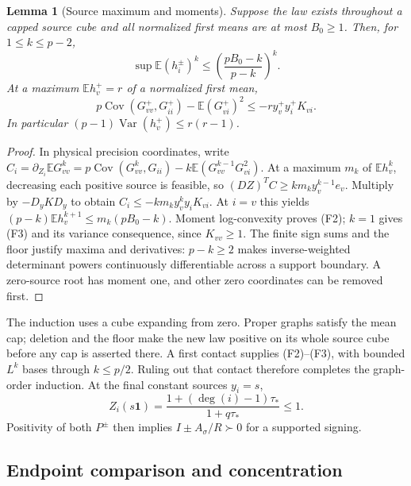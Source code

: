 \documentclass[10pt]{article}
\numberwithin{equation}{section}
\newtheorem{lemma}{Lemma}[section]
\newcommand{\1}{\mathbf1}
\begin{document}
\begin{lemma}[Source maximum and moments]\label{lem:fw-maximum}
Suppose the law exists throughout a capped source cube and all
normalized first means are at most $B_0\ge1$. Then, for
$1\le k\le p-2$,
\[
 \sup\mathbb E(h_i^\pm)^k
       \le\left(\frac{pB_0-k}{p-k}\right)^k.        \tag{F2}\label{eq:fw-moments}
\]
At a maximum $\mathbb E h_v^+=r$ of a normalized first mean,
\[
 p\operatorname{Cov}(G^+_{vv},G^+_{ii})
       -\mathbb E(G^+_{vi})^2
       \le-r y_v^+y_i^+K_{vi}.                    \tag{F3}\label{eq:fw-covariance}
\]
In particular $(p-1)\operatorname{Var}(h_v^+)\le r(r-1)$.
\end{lemma}
\begin{proof}
In physical precision coordinates, write
$C_i=\partial_{Z_i}\mathbb E G_{vv}^k
=p\operatorname{Cov}(G_{vv}^k,G_{ii})
-k\mathbb E(G_{vv}^{k-1}G_{vi}^2)$.
At a maximum $m_k$ of $\mathbb E h_v^k$, decreasing each positive
source is feasible, so
$(DZ)^TC\ge k m_k y_v^{k-1}e_v$.
Multiply by $-D_yKD_y$ to obtain
$C_i\le-km_k y_v^k y_iK_{vi}$.
At $i=v$ this yields
$(p-k)\mathbb E h_v^{k+1}\le m_k(pB_0-k)$.
Moment log-convexity proves (F2); $k=1$ gives (F3) and its variance
consequence, since $K_{vv}\ge1$.
The finite sign sums and the floor justify maxima and derivatives:
$p-k\ge2$ makes inverse-weighted determinant powers continuously
differentiable across a support boundary. A zero-source root has
moment one, and other zero coordinates can be removed first.
\end{proof}


The induction uses a cube expanding from zero. Proper graphs satisfy
the mean cap; deletion and the floor make the new law positive on
its whole source cube before any cap is asserted there. A first
contact supplies (F2)--(F3), with bounded $L^k$ bases through $k\le p/2$.
Ruling out that contact therefore completes the graph-order induction.
At the final constant sources $y_i=s$,
\[
 Z_i(s\mathbf1)=\frac{1+(\deg(i)-1)\tau_*}{1+q\tau_*}\le1.
\]
Positivity of both $P^\pm$ then implies $I\pm A_\sigma/R\succ0$
for a supported signing.

\subsection{Endpoint comparison and concentration}
\end{document}
